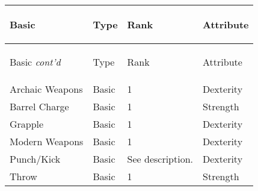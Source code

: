 \documentclass[twoside]{book}
\begin{document}
\begin{longtable}{p{1.25in}lll} 
  Basic
  &
  \begin{turn}{70}{Type}\end{turn}
          
  &
  \begin{turn}{70}{Rank}\end{turn}
          
  &
  \begin{turn}{70}{Attribute}\end{turn}
          
  \\
  \hline
  \hline
  \endfirsthead
  Basic \textit{cont'd}
        
  &
  \begin{turn}{70}{Type}\end{turn}
          
  &
  \begin{turn}{70}{Rank}\end{turn}
          
  &
  \begin{turn}{70}{Attribute}\end{turn}
          
  \\
  \hline
  \endhead
      
  \raggedright
           Archaic Weapons 
  &
   Basic 
  &
   1 
  &
   Dexterity 
  \tabularnewline
      
  \raggedright
           Barrel Charge 
  &
   Basic 
  &
   1 
  &
   Strength 
  \tabularnewline
      
  \raggedright
           Grapple 
  &
   Basic 
  &
   1 
  &
   Dexterity 
  \tabularnewline
      
  \raggedright
           Modern Weapons 
  &
   Basic 
  &
   1 
  &
   Dexterity 
  \tabularnewline
      
  \raggedright
           Punch/Kick 
  &
   Basic 
  &
   See description. 
  &
   Dexterity 
  \tabularnewline
      
  \raggedright
           Throw 
  &
   Basic 
  &
   1 
  &
   Strength 
  \tabularnewline
      
\end{longtable}
    
\end{document}
